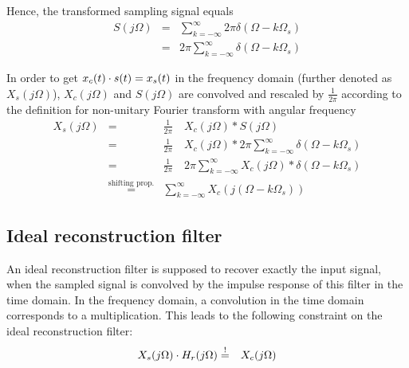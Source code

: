 Hence, the transformed sampling signal equals
\begin{eqnarray*}
S(j\Omega) & = & \sum_{k=-\infty}^{\infty} 2\pi \delta(\Omega - k\Omega_s) \\
& = & 2\pi \sum_{k=-\infty}^{\infty} \delta(\Omega - k\Omega_s)
\end{eqnarray*}

In order to get $x_c(t) \cdot s(t) = x_s(t)$ in the frequency domain (further denoted as $X_s(j\Omega)$), $X_c(j\Omega)$ and $S(j\Omega)$ are convolved and rescaled by $\frac{1}{2\pi}$ according to the definition for non-unitary Fourier transform with angular frequency
\begin{eqnarray*}
X_s(j\Omega) & = & \frac{1}{2\pi} \quad X_c(j\Omega) \ast S(j\Omega) \\
 & = & \frac{1}{2\pi} \quad X_c(j\Omega) \ast 2\pi \sum_{k=-\infty}^{\infty} \delta(\Omega - k\Omega_s) \\
 & = & \frac{1}{2\pi} \quad 2\pi \sum_{k=-\infty}^{\infty} X_c(j\Omega) \ast \delta(\Omega - k\Omega_s) \\
 & \overset{\text{shifting prop.}}{=} & \sum_{k=-\infty}^{\infty} X_c(j(\Omega-k\Omega_s) )
\end{eqnarray*}

\subsection{Ideal reconstruction filter}

An ideal reconstruction filter is supposed to recover exactly the input signal, when the sampled signal is convolved by the impulse response of this filter in the time domain. In the frequency domain, a convolution in the time domain corresponds to a multiplication. This leads to the following constraint on the ideal reconstruction filter:
\begin{eqnarray*}
X_s(j\Omega) \cdot H_r(j\Omega) & \overset{!}{=} & X_c(j\Omega)
\end{eqnarray*}

